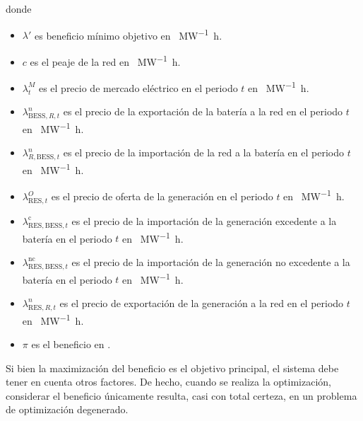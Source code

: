 donde

\begin{itemize}

  \item \( \lambda' \) es beneficio mínimo objetivo en \si{\text{\euro}\per\mega\watt\hour}.

  \item \( c \) es el peaje de la red en \si{\text{\euro}\per\mega\watt\hour}.

  \item \( \lambda^{M}_{t} \) es el precio de mercado eléctrico en el periodo \( t \) en \si{\text{\euro}\per\mega\watt\hour}.

  \item \( \lambda^{n}_{\text{BESS}, R, t} \) es el precio de la exportación de la batería a la red en el periodo \( t \) en \si{\text{\euro}\per\mega\watt\hour}.

  \item \( \lambda^{n}_{R, \text{BESS}, t}\) es el precio de la importación de la red a la batería en el periodo \( t \) en \si{\text{\euro}\per\mega\watt\hour}.

  \item \( \lambda^{O}_{\text{RES}, t} \) es el precio de oferta de la generación en el periodo \( t \) en \si{\text{\euro}\per\mega\watt\hour}.

  \item \( \lambda^{\text{c}}_{\text{RES}, \text{BESS}, t} \) es el precio de la importación de la generación excedente a la batería en el periodo \( t \) en \si{\text{\euro}\per\mega\watt\hour}.

  \item \( \lambda^{\text{nc}}_{\text{RES}, \text{BESS}, t} \) es el precio de la importación de la generación no excedente a la batería en el periodo \( t \) en \si{\text{\euro}\per\mega\watt\hour}.

  \item \( \lambda^{n}_{\text{RES}, R, t} \) es el precio de exportación de la generación a la red en el periodo \( t \) en \si{\text{\euro}\per\mega\watt\hour}.

  \item \( \pi \) es el beneficio en \si{\text{\euro}}.

\end{itemize}

Si bien la maximización del beneficio es el objetivo principal, el sistema debe tener en cuenta otros factores. De hecho, cuando se realiza la optimización, considerar el beneficio únicamente resulta, casi con total certeza, en un problema de optimización degenerado.

